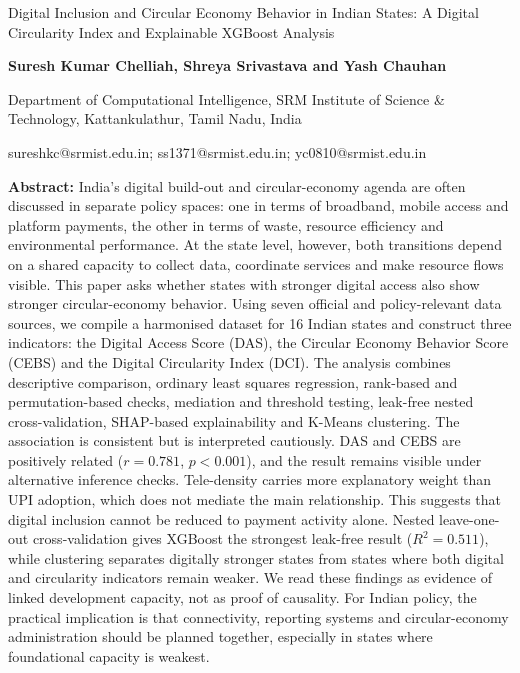 \documentclass[10pt,a4paper]{article}
\newcommand{\TitleFont}{\bfseries\sffamily}
\newcommand{\AuthorFont}{\bfseries\sffamily}
\newcommand{\MetaFont}{\sffamily}
\renewcommand{\TitleFont}{\PaperTitleFace}
\renewcommand{\AuthorFont}{\PaperHeadingFace}
\renewcommand{\MetaFont}{\PaperMetaFace}
\renewcommand{\MetaFont}{\PaperMetaFace}
\begin{document}
\pagestyle{plain}

\begin{center}
{\TitleFont\fontsize{20}{24}\selectfont Digital Inclusion and Circular Economy Behavior in Indian States: A Digital Circularity Index and Explainable XGBoost Analysis\par}
\vspace{0.45cm}
{\AuthorFont\large\bfseries Suresh Kumar Chelliah, Shreya Srivastava and Yash Chauhan\par}
\vspace{0.1cm}
{\MetaFont\normalsize Department of Computational Intelligence, SRM Institute of Science \& Technology, Kattankulathur, Tamil Nadu, India\par}
{\MetaFont\normalsize sureshkc@srmist.edu.in; ss1371@srmist.edu.in; yc0810@srmist.edu.in\par}
\end{center}

\textbf{Abstract:} India's digital build-out and circular-economy agenda are often discussed in separate policy spaces: one in terms of broadband, mobile access and platform payments, the other in terms of waste, resource efficiency and environmental performance. At the state level, however, both transitions depend on a shared capacity to collect data, coordinate services and make resource flows visible. This paper asks whether states with stronger digital access also show stronger circular-economy behavior. Using seven official and policy-relevant data sources, we compile a harmonised dataset for 16 Indian states and construct three indicators: the Digital Access Score (DAS), the Circular Economy Behavior Score (CEBS) and the Digital Circularity Index (DCI). The analysis combines descriptive comparison, ordinary least squares regression, rank-based and permutation-based checks, mediation and threshold testing, leak-free nested cross-validation, SHAP-based explainability and K-Means clustering. The association is consistent but is interpreted cautiously. DAS and CEBS are positively related ($r=0.781$, $p<0.001$), and the result remains visible under alternative inference checks. Tele-density carries more explanatory weight than UPI adoption, which does not mediate the main relationship. This suggests that digital inclusion cannot be reduced to payment activity alone. Nested leave-one-out cross-validation gives XGBoost the strongest leak-free result ($R^2=0.511$), while clustering separates digitally stronger states from states where both digital and circularity indicators remain weaker. We read these findings as evidence of linked development capacity, not as proof of causality. For Indian policy, the practical implication is that connectivity, reporting systems and circular-economy administration should be planned together, especially in states where foundational capacity is weakest.
\end{document}
